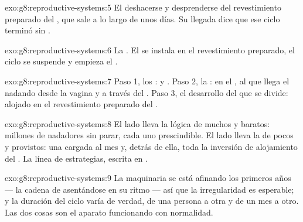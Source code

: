 \begin{solution}{exo:g8:reproductive-systems:5}
El deshacerse y desprenderse del revestimiento preparado del , que
sale a lo largo de unos días. Su llegada dice que ese ciclo terminó sin
.
\end{solution}

\begin{solution}{exo:g8:reproductive-systems:6}
La . El  se instala en el revestimiento preparado, el
ciclo se suspende y empieza el .
\end{solution}

\begin{solution}{exo:g8:reproductive-systems:7}
Paso 1, los :  y . Paso 2, la : en
el , al que llega el  nadando desde la vagina y a
través del . Paso 3, el desarrollo del  que se divide:
alojado en el revestimiento preparado del .
\end{solution}

\begin{solution}{exo:g8:reproductive-systems:8}
El lado  lleva la lógica de muchos y baratos: millones de
nadadores sin parar, cada uno prescindible. El lado  lleva la
de pocos y provistos: una   cargada al mes y, detrás de
ella, toda la inversión de alojamiento del . La línea de
estrategias, escrita en .
\end{solution}

\begin{solution}{exo:g8:reproductive-systems:9}
La maquinaria se está afinando los primeros años --- la cadena de
 asentándose en su ritmo --- así que la irregularidad es
esperable; y la duración del ciclo varía de verdad, de una persona a
otra y de un mes a otro. Las dos cosas son el aparato funcionando con
normalidad.
\end{solution}

